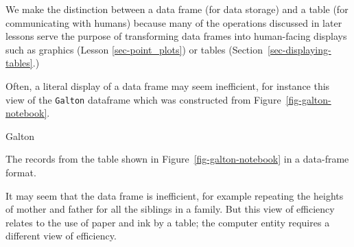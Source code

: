 \documentclass[
  letterpaper,
  DIV=11,
  numbers=noendperiod,
  oneside]{scrartcl}
\newenvironment{Shaded}{\begin{snugshade}}{\end{snugshade}}
\newcommand{\NormalTok}[1]{\textcolor[rgb]{0.00,0.23,0.31}{#1}}
\begin{document}
\begin{tcolorbox}
\begin{figure}[H]
\end{figure}%

We make the distinction between a data frame (for data storage) and a
table (for communicating with humans) because many of the operations
discussed in later lessons serve the purpose of transforming data frames
into human-facing displays such as graphics (Lesson
\ref{sec-point_plots}) or tables (Section~\ref{sec-displaying-tables}.)

Often, a literal display of a data frame may seem inefficient, for
instance this view of the \texttt{Galton} dataframe which was
constructed from Figure~\ref{fig-galton-notebook}.

\begin{Shaded}
\begin{Highlighting}[]
\NormalTok{Galton}
\end{Highlighting}
\end{Shaded}

\begin{table}[H]

\caption{\label{tbl-galton-dataframe}The records from the table shown in
Figure~\ref{fig-galton-notebook} in a data-frame format.}


\end{table}%

It may seem that the data frame is inefficient, for example repeating
the heights of mother and father for all the siblings in a family. But
this view of efficiency relates to the use of paper and ink by a table;
the computer entity requires a different view of efficiency.

\end{tcolorbox}
\end{document}

